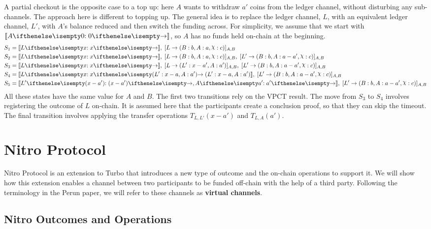 \documentclass{article}
\begin{document}
A partial checkout is the opposite case to a top up: here $A$ wants to withdraw $a'$ coins from the ledger channel, without disturbing any sub-channels.
The approach here is different to topping up.
The general idea is to replace the ledger channel, $L$, with an equivalent ledger channel, $L'$, with $A$'s balance reduced and then switch the funding across.
For simplicity, we assume that we start with $\adj{\holds{A}{0}{}}$, so $A$ has no funds held on-chain at the beginning.
\begin{align*}
S_1 &= \adj{\holds{L}{x}{}}, \; \finalizable{L}{\alloc{B: b, A: a, \rchi: c}}{A, B}  \\
S_2 &= \adj{\holds{L}{x}{}}, \; \finalizable{L}{\alloc{B: b, A: a, \rchi: c}}{A, B}, \; \finalizable{L'}{\alloc{B: b, A: a - a', \rchi: c}}{A, B} \\
S_3 &= \adj{\holds{L}{x}{}}, \; \finalizable{L}{\alloc{L': x-a', A: a'}}{A, B}, \; \finalizable{L'}{\alloc{B: b, A: a - a', \rchi: c}}{A, B}\\
S_4 &= \adj{\holds{L}{x}{\alloc{L': x-a, A: a'}}}, \; \finalizable{L'}{\alloc{B: b, A: a - a', \rchi: c}}{A, B}\\
S_5 &= \adj{\holds{L'}{(x-a')}{}, \holds{A}{a'}{}}, \; \finalizable{L'}{\alloc{B: b, A: a - a', \rchi: c}}{A, B}
\end{align*}
All these states have the same value for $A$ and $B$.
The first two transitions rely on the VPCT result.
The move from $S_3$ to $S_4$ involves registering the outcome of $L$ on-chain.
It is assumed here that the participants create a conclusion proof, so that they can
skip the timeout.
The final transition involves applying the transfer operations $T_{L, L'}(x-a')$ and $T_{L, A}(a')$.

\section{Nitro Protocol}

Nitro Protocol is an extension to Turbo that introduces a new type of outcome and the on-chain operations to support it. 
We will show how this extension enables a channel between two participants to be funded off-chain with the help of a third party.
Following the terminology in the Perun paper, we will refer to these channels as \textbf{virtual channels}.

\subsection{Nitro Outcomes and Operations}
\end{document}
